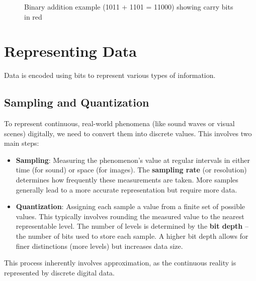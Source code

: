 \documentclass[11pt,oneside]{book}
\begin{document}
\begin{figure}[h!]
    \centering
    \caption{Binary addition example (1011 + 1101 = 11000) showing carry bits in red}
    \label{fig:binary-addition}
\end{figure}

\section{Representing Data}
\label{sec:representing_data}
Data is encoded using bits to represent various types of information.

\subsection*{Sampling and Quantization}
\label{subsec:sampling}
To represent continuous, real-world phenomena (like sound waves or visual scenes) digitally, we need to convert them into discrete values. This involves two main steps:
\begin{itemize}
    \item \textbf{Sampling}: Measuring the phenomenon's value at regular intervals in either time (for sound) or space (for images). The \textbf{sampling rate} (or resolution) determines how frequently these measurements are taken. More samples generally lead to a more accurate representation but require more data.
    \item \textbf{Quantization}: Assigning each sample a value from a finite set of possible values. This typically involves rounding the measured value to the nearest representable level. The number of levels is determined by the \textbf{bit depth} – the number of bits used to store each sample. A higher bit depth allows for finer distinctions (more levels) but increases data size.
\end{itemize}
This process inherently involves approximation, as the continuous reality is represented by discrete digital data.
\end{document}

